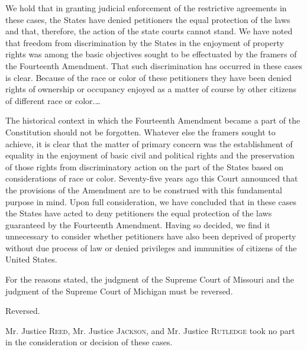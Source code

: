 We hold that in granting judicial enforcement of the restrictive agreements in
these cases, the States have denied petitioners the equal protection of the laws
and that, therefore, the action of the state courts cannot stand. We have noted
that freedom from discrimination by the States in the enjoyment of property
rights was among the basic objectives sought to be effectuated by the framers of
the Fourteenth Amendment. That such discrimination has occurred in these cases
is clear. Because of the race or color of these petitioners they have been
denied rights of ownership or occupancy enjoyed as a matter of course by other
citizens of different race or color.\ldots

The historical context in which the Fourteenth Amendment became a part of the
Constitution should not be forgotten. Whatever else the framers sought to
achieve, it is clear that the matter of primary concern was the establishment of
equality in the enjoyment of basic civil and political rights and the
preservation of those rights from discriminatory action on the part of the
States based on considerations of race or color. Seventy-five years ago this
Court announced that the provisions of the Amendment are to be construed with
this fundamental purpose in mind. Upon full consideration, we have concluded
that in these cases the States have acted to deny petitioners the equal
protection of the laws guaranteed by the Fourteenth Amendment. Having so
decided, we find it unnecessary to consider whether petitioners have also been
deprived of property without due process of law or denied privileges and
immunities of citizens of the United States.

For the reasons stated, the judgment of the Supreme Court of Missouri and the
judgment of the Supreme Court of Michigan must be reversed.

Reversed.

Mr. Justice \textsc{Reed}, Mr. Justice \textsc{Jackson}, and Mr. Justice
\textsc{Rutledge} took no part in the consideration or decision of these cases.

